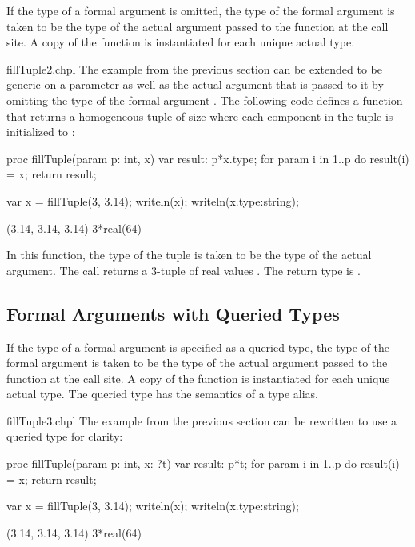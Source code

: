 If the type of a formal argument is omitted, the type of the formal
argument is taken to be the type of the actual argument passed to the
function at the call site.  A copy of the function is instantiated for
each unique actual type.
\begin{chapelexample}{fillTuple2.chpl}
The example from the previous section can be extended to be generic on
a parameter as well as the actual argument that is passed to it by
omitting the type of the formal argument .  The following code
defines a function that returns a homogeneous tuple of size 
where each component in the tuple is initialized to :
\begin{chapel}
proc fillTuple(param p: int, x) {
  var result: p*x.type;
  for param i in 1..p do
    result(i) = x;
  return result;
}
\end{chapel}
\begin{chapelpost}
var x = fillTuple(3, 3.14);
writeln(x);
writeln(x.type:string);
\end{chapelpost}
\begin{chapeloutput}
(3.14, 3.14, 3.14)
3*real(64)
\end{chapeloutput}
In this function, the type of the tuple is taken to be the type of the
actual argument.  The call  returns a 3-tuple
of real values .  The return type is
.
\end{chapelexample}

\subsection{Formal Arguments with Queried Types}
\label{Formal_Arguments_with_Queried_Types}

If the type of a formal argument is specified as a queried type, the
type of the formal argument is taken to be the type of the actual
argument passed to the function at the call site.  A copy of the
function is instantiated for each unique actual type.  The queried
type has the semantics of a type alias.
\begin{chapelexample}{fillTuple3.chpl}
The example from the previous section can be rewritten to use a
queried type for clarity:
\begin{chapel}
proc fillTuple(param p: int, x: ?t) {
  var result: p*t;
  for param i in 1..p do
    result(i) = x;
  return result;
}
\end{chapel}
\begin{chapelpost}
var x = fillTuple(3, 3.14);
writeln(x);
writeln(x.type:string);
\end{chapelpost}
\begin{chapeloutput}
(3.14, 3.14, 3.14)
3*real(64)
\end{chapeloutput}
\end{chapelexample}


